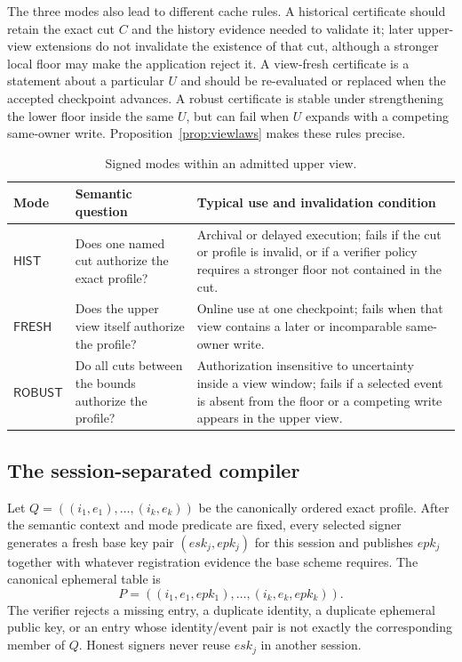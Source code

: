 \documentclass[11pt]{article}
\theoremstyle{definition}
\begin{document}
The three modes also lead to different cache rules.  A historical certificate should retain the exact cut $C$ and the history evidence needed to validate it; later upper-view extensions do not invalidate the existence of that cut, although a stronger local floor may make the application reject it.  A view-fresh certificate is a statement about a particular $U$ and should be re-evaluated or replaced when the accepted checkpoint advances.  A robust certificate is stable under strengthening the lower floor inside the same $U$, but can fail when $U$ expands with a competing same-owner write.  Proposition~\ref{prop:viewlaws} makes these rules precise.

\begin{table}[t]
\centering
\caption{Signed modes within an admitted upper view.}
\label{tab:modes}
\begin{tabularx}{\linewidth}{@{}p{.17\linewidth}p{.24\linewidth}X@{}}
\toprule
Mode & Semantic question & Typical use and invalidation condition\\
\midrule
$\mathsf{HIST}$ & Does one named cut authorize the exact profile? & Archival or delayed execution; fails if the cut or profile is invalid, or if a verifier policy requires a stronger floor not contained in the cut.\\
$\mathsf{FRESH}$ & Does the upper view itself authorize the profile? & Online use at one checkpoint; fails when that view contains a later or incomparable same-owner write.\\
$\mathsf{ROBUST}$ & Do all cuts between the bounds authorize the profile? & Authorization insensitive to uncertainty inside a view window; fails if a selected event is absent from the floor or a competing write appears in the upper view.\\
\bottomrule
\end{tabularx}
\end{table}

\subsection{The session-separated compiler}\label{subsec:session-compiler}
Let $Q=((i_1,e_1),\ldots,(i_k,e_k))$ be the canonically ordered exact profile.  After the semantic context and mode predicate are fixed, every selected signer generates a fresh base key pair $(esk_j,epk_j)$ for this session and publishes $epk_j$ together with whatever registration evidence the base scheme requires.  The canonical ephemeral table is
\[
 P=((i_1,e_1,epk_1),\ldots,(i_k,e_k,epk_k)).
\]
The verifier rejects a missing entry, a duplicate identity, a duplicate ephemeral public key, or an entry whose identity/event pair is not exactly the corresponding member of $Q$.  Honest signers never reuse $esk_j$ in another session.
\end{document}
